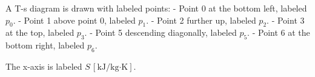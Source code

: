 A T-s diagram is drawn with labeled points:  
- Point 0 at the bottom left, labeled \( p_0 \).  
- Point 1 above point 0, labeled \( p_1 \).  
- Point 2 further up, labeled \( p_2 \).  
- Point 3 at the top, labeled \( p_3 \).  
- Point 5 descending diagonally, labeled \( p_5 \).  
- Point 6 at the bottom right, labeled \( p_6 \).  

The x-axis is labeled \( S \, [\text{kJ/kg·K}] \).